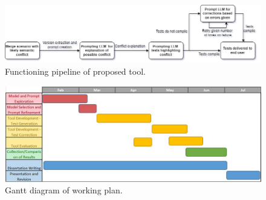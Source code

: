 \begin{figure}
    \centering
    \includegraphics[width=1\linewidth]{figures/tool.png}
    \caption{Functioning pipeline of proposed tool.}
    \label{fig:tool}
\end{figure}

\begin{figure}
    \centering
    \includegraphics[width=1\linewidth]{figures/gantt.jpg}
    \caption{Gantt diagram of working plan.}
    \label{fig:gantt}
\end{figure}
